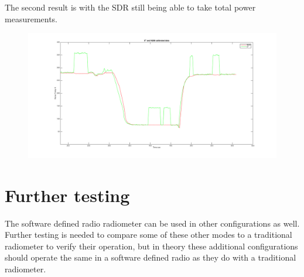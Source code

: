 The second result is with the SDR still being able to take total power measurements. 

\begin{figure}[h!tb] \centering

\includegraphics[width=\textwidth]{Images/moneyshot.png}

\label{sdr_x2_filter}
\end{figure} 

\section{Further testing}
The software defined radio radiometer can be used in other configurations as well.  Further testing is needed to compare some of these other modes to a traditional radiometer to verify their operation, but in theory these additional configurations should operate the same in a software defined radio as they do with a traditional radiometer.
